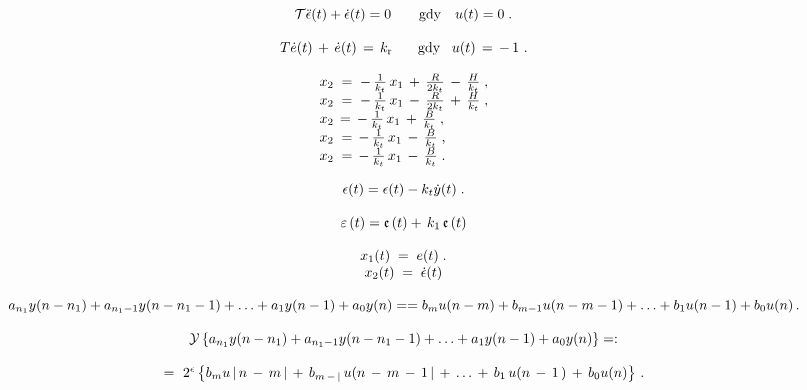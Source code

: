 \documentclass{article}
\begin{document}
\[
$$
{\cal T} \ddot{\epsilon} ( t )+\dot{\epsilon} ( t )=0 \qquad\mathrm{g d y} \quad u ( t )=0 \;.
$$
\]

\[
$$
T \dot{e} ( t ) \,+\, \dot{e} ( t ) \,=\, k_{\mathrm{r}} \, \, \, \, \, \, \, \, \, \, \, \mathrm{g d y} \, \, \, \, \, u ( t ) \,=\,-\, 1 \, \,.
$$
\]

\[
$$
\begin{array} {l} {x_{2} \;=\;-\, \frac{1} {k_{t}} \, x_{1} \,+\, \frac{R} {2 k_{t}} \,-\, \frac{H} {k_{t}} \;,} \\ {x_{2} \;=\;-\, \frac{1} {k_{t}} \, x_{1} \,-\, \frac{R} {2 k_{t}} \,+\, \frac{H} {k_{t}} \;,} \\ {x_{2} \,=\,-\, \frac{1} {k_{t}} \, x_{1} \,+\, \frac{B} {k_{t}} \;,} \\ {x_{2} \;=\,-\, \frac{1} {k_{t}} \, x_{1} \,-\, \frac{B} {k_{t}} \;,} \\ {x_{2} \;=\,-\, \frac{1} {k_{t}} \, x_{1} \,-\, \frac{B} {k_{t}} \;.} \\ \end{array}
$$
\]

\[
$$
\epsilon( t )=\epsilon( t )-k_{t} \dot{y} ( t ) \;.
$$
\]

\[
$$
\varepsilon\left( t \right)=\mathfrak{e} \left( t \right)+\, k_{1} \, \mathfrak{e} \left( t \right)
$$
\]

\[
$$
\begin{array} {c} {x_{1} ( t ) \;=\; e ( t ) \;.} \\ {x_{2} ( t ) \;=\; \dot{\epsilon} ( t )} \\ \end{array}
$$
\]

\[
$$
a_{n_{1}} y ( n-n_{1} )+a_{n_{1}-1} y ( n-n_{1}-1 )+\ldots+a_{1} y ( n-1 )+a_{0} y ( n )=
$$
$$
= b_{m} u ( n-m )+b_{m-1} u ( n-m-1 )+\ldots+b_{1} u ( n-1 )+b_{0} u ( n ) \,.
$$
\]

\[
$$
\mathcal{Y} \left\{a_{n_{1}} y ( n-n_{1} )+a_{n_{1}-1} y ( n-n_{1}-1 )+\ldots+a_{1} y ( n-1 )+a_{0} y ( n ) \right\}=
$$
:
\]

\[
$$
= ~ 2^{\epsilon} \left\{b_{m} u \, | \, n \,-\, m \, | \,+\, b_{m \,-\, |} \, u ( n \,-\, m \,-\, 1 \, | \,+\, \ldots\,+\, b_{1} \, u ( n \,-\, 1 \, ) \,+\, b_{0} u ( n ) \right\} \,.
$$
\]
\end{document}
